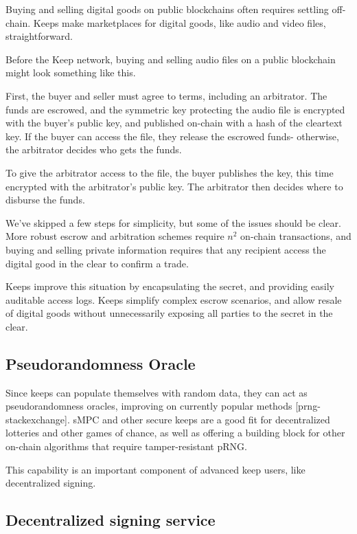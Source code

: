 \documentclass[11pt]{article}
\begin{document}
Buying and selling digital goods on public blockchains often requires
settling off-chain. Keeps make marketplaces for digital goods, like
audio and video files, straightforward.

Before the Keep network, buying and selling audio files on a public
blockchain might look something like this.

First, the buyer and seller must agree to terms, including an
arbitrator. The funds are escrowed, and the symmetric key protecting
the audio file is encrypted with the buyer’s public key, and published
on-chain with a hash of the cleartext key. If the buyer can access the
file, they release the escrowed funds- otherwise, the arbitrator
decides who gets the funds.

To give the arbitrator access to the file, the buyer publishes the
key, this time encrypted with the arbitrator’s public key. The
arbitrator then decides where to disburse the funds.

We’ve skipped a few steps for simplicity, but some of the issues
should be clear. More robust escrow and arbitration schemes require
${n^2}$ on-chain transactions, and buying and selling private
information requires that any recipient access the digital good in the
clear to confirm a trade.

Keeps improve this situation by encapsulating the secret, and
providing easily auditable access logs. Keeps simplify complex escrow
scenarios, and allow resale of digital goods without unnecessarily
exposing all parties to the secret in the clear.

\subsection{Pseudorandomness Oracle}

Since keeps can populate themselves with random data, they can act as
pseudorandomness oracles, improving on currently popular methods
[prng-stackexchange]. sMPC and other secure keeps are a good fit for
decentralized lotteries and other games of chance, as well as offering
a building block for other on-chain algorithms that require
tamper-resistant pRNG.

This capability is an important component of advanced keep users, like
decentralized signing.

\subsection{Decentralized signing service}
\end{document}
